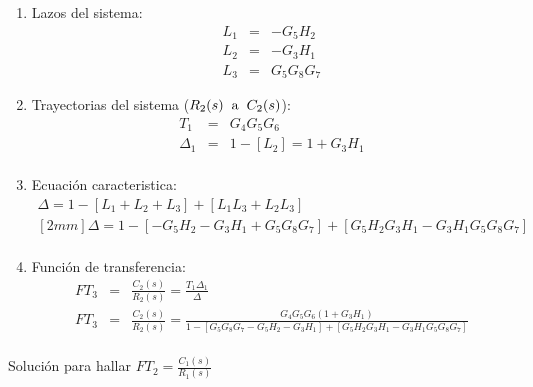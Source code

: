\documentclass[12pt]{article}
\begin{document}
\begin{enumerate}
  \item Lazos del sistema:
    \begin{eqnarray*}
      L_{1} &=& - G_{5}H_{2} \\
      L_{2} &=& - G_{3}H_{1} \\
      L_{3} &=& G_{5}G_{8}G_{7}
    \end{eqnarray*}
  \item Trayectorias del sistema ($R_{2}(s) \hspace{2mm} \text{a} \hspace{2mm} C_{2}(s)$):
    \begin{eqnarray*}
      T_{1} &=& G_{4}G_{5}G_{6} \\
      \Delta_{1} &=& 1-[L_{2}]=1+G_{3}H_{1} \\
    \end{eqnarray*}
  \item Ecuaci\'on caracteristica:
    \begin{eqnarray*}
      \Delta = 1-[L_{1}+L_{2}+L_{3}]+[L_{1}L_{3}+L_{2}L_{3}] \\ [2mm]
      \Delta = 1-[-G_{5}H_{2}-G_{3}H_{1}+G_{5}G_{8}G_{7}]+[G_{5}H_{2}G_{3}H_{1}-G_{3}H_{1}G_{5}G_{8}G_{7}]\\
    \end{eqnarray*}
  \item Funci\'on de transferencia:
    \begin{eqnarray*}
      FT_{3} &=& \frac{C_{2}(s)}{R_{2}(s)}=\frac{T_{1}\Delta_{1}}{\Delta} \\[5mm]
      FT_{3} &=&\frac{C_{2}(s)}{R_{2}(s)} = \frac{G_{4}G_{5}G_{6}(1+G_{3}H_{1})}{1-[G_{5}G_{8}G_{7}-G_{5}H_{2}-G_{3}H_{1}]+[G_{5}H_{2}G_{3}H_{1}-G_{3}H_{1}G_{5}G_{8}G_{7}]} \\
    \end{eqnarray*}
\end{enumerate}

Soluci\'on para hallar \( \displaystyle FT_{2}=\frac{C_{1}(s)}{R_{1}(s)} \)
\end{document}
